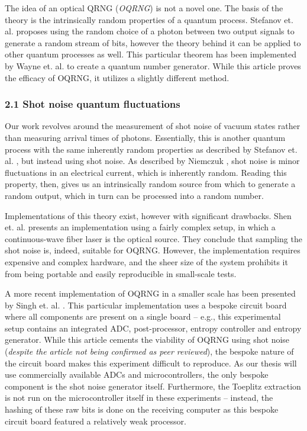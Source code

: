 The idea of an optical QRNG (\emph{OQRNG}) is not a novel one. The basis of the theory is the intrinsically random properties of a quantum process. Stefanov et. al. \cite{StefanovOptical} proposes using the random choice of a photon between two output signals to generate a random stream of bits, however the theory behind it can be applied to other quantum processes as well. This particular theorem has been implemented by Wayne et. al. \cite{Wayne} to create a quantum number generator. While this article proves the efficacy of OQRNG, it utilizes a slightly different method.

\subsubsection{2.1 Shot noise quantum fluctuations}\label{shot-noise-quantum-fluctuations}

Our work revolves around the measurement of shot noise of vacuum states rather than measuring arrival times of photons. Essentially, this is another quantum process with the same inherently random properties as described by Stefanov et. al. \cite{StefanovOptical}, but instead using shot noise. As described by Niemczuk \cite{shotnoise}, shot noise is minor fluctuations in an electrical current, which is inherently random. Reading this property, then, gives us an intrinsically random source from which to generate a random output, which in turn can be processed into a random number.

Implementations of this theory exist, however with significant drawbacks. Shen et. al. \cite{contender1} presents an implementation using a fairly complex setup, in which a continuous-wave fiber laser is the optical source. They conclude that sampling the shot noise is, indeed, suitable for OQRNG. However, the implementation requires expensive and complex hardware, and the sheer size of the system prohibits it from being portable and easily reproducible in small-scale tests.

A more recent implementation of OQRNG in a smaller scale has been presented by Singh et. al. \cite{singh}. This particular implementation uses a bespoke circuit board where all components are present on a single board -- e.g., this experimental setup contains an integrated ADC, post-processor, entropy controller and entropy generator. While this article cements the viability of OQRNG using shot noise (\emph{despite the article not being confirmed as peer reviewed}), the bespoke nature of the circuit board makes this experiment difficult to reproduce. As our thesis will use commercially available ADCs and microcontrollers, the only bespoke component is the shot noise generator itself. Furthermore, the Toeplitz extraction is not run on the microcontroller itself in these experiments -- instead, the hashing of these raw bits is done on the receiving computer as this bespoke circuit board featured a relatively weak processor.


